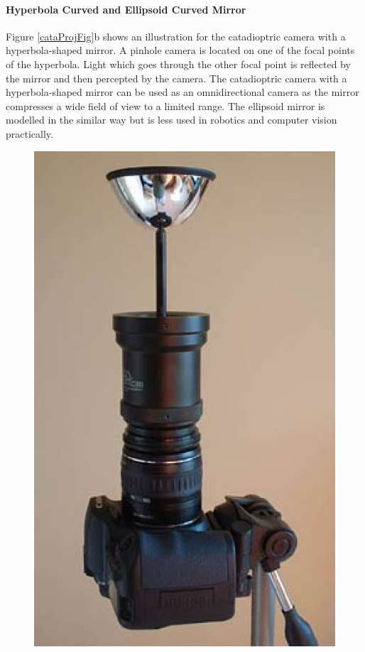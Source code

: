 \documentclass{report}
\begin{document}
\paragraph{Hyperbola Curved and Ellipsoid Curved Mirror} Figure \ref{cataProjFig}b shows an illustration for the catadioptric camera with a hyperbola-shaped mirror. A pinhole camera is located on one of the focal points of the hyperbola. Light which goes through the other focal point is reflected by the mirror and then percepted by the camera. The catadioptric camera with a hyperbola-shaped mirror can be used as an omnidirectional camera as the mirror compresses a wide field of view to a limited range. The ellipsoid mirror is modelled in the similar way but is less used in robotics and computer vision practically. 


\begin{savenotes}
\begin{figure}
\centering
\begin{minipage}{0.457\textwidth}
\centering
\includegraphics[trim=0in 0in 0in 0in, clip=true, width=1\textwidth]{images/catacamera.eps} \\

\end{minipage}
\end{figure}
\end{savenotes}
\end{document}
